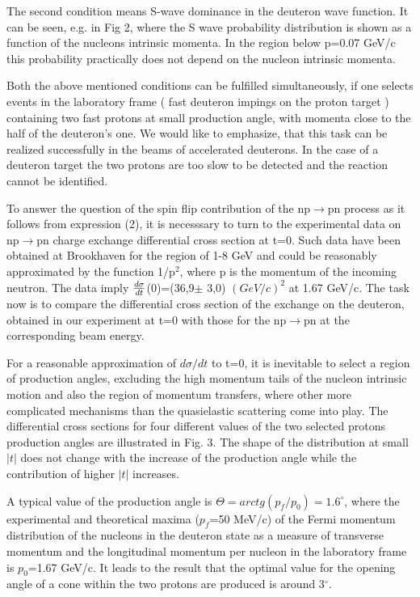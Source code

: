 \documentclass[a4paper,12pt]{article}
\begin{document}
    The second condition means S-wave dominance in the deuteron wave function.
    It can be seen, e.g. in Fig 2, where the S wave probability distribution
    is shown as a function of the nucleons intrinsic momenta. In the region
    below p=0.07 GeV/c this probability practically does not depend on the nucleon
    intrinsic momenta.

    Both the above mentioned conditions can be fulfilled simultaneously, if one
    selects events in the laboratory frame ( fast deuteron impings on the proton
    target ) containing two fast protons  at small
    production angle, with momenta close
    to the half of the deuteron's one. We would like to emphasize, that this task
    can be realized successfully in the beams of accelerated deuterons.
    In the case of a deuteron target the two protons are too slow to be detected
    and the reaction cannot be identified.

    To answer the question of the spin flip contribution of the np$\to$pn process
    as it follows from expression (2), it is
    necesssary to turn to the experimental data on np$\to$pn charge exchange
    differential cross section at t=0. Such data have been obtained at Brookhaven
    \cite{Fri} for the region of 1-8 GeV and could be reasonably approximated
    by the function 1/p$^2$, where p is the momentum of the incoming
    neutron. The data imply ${d\sigma\over dt}$(0)=(36,9$\pm$ 3,0) $(GeV/c)^2$
    at 1.67 GeV/c.  The task now is to compare the differential cross section
    of the exchange on the deuteron, obtained in our experiment at t=0 with
    those for the np$\to$pn at the corresponding beam energy.

    For a reasonable approximation of $d\sigma/dt$ to t=0, it is inevitable
    to select a region of production angles, excluding the high momentum
    tails of the nucleon intrinsic motion and also the region of momentum
    transfers, where other more complicated mechanisms than the quasielastic
    scattering come into play. The differential cross sections
    for four different values of the two selected protons production angles are
    illustrated in Fig. 3.  The shape
    of the distribution at small $\vert t \vert$ does not change with the increase
    of the production angle while
    the contribution of higher $\vert t \vert$ increases.

    A typical value of the production angle is
    $\Theta=arctg(p_f/p_0)=1.6^{\circ}$, where
    the experimental and theoretical maxima ($p_f$=50 MeV/c) of the Fermi
    momentum distribution of the nucleons in the deuteron state as a measure
    of transverse momentum and the longitudinal momentum per nucleon
    in the laboratory frame is $p_0$=1.67 GeV/c.
    It leads to the result that the optimal value for the opening angle
    of a cone within the two
    protons are produced is around 3$^{\circ}$.
\end{document}
